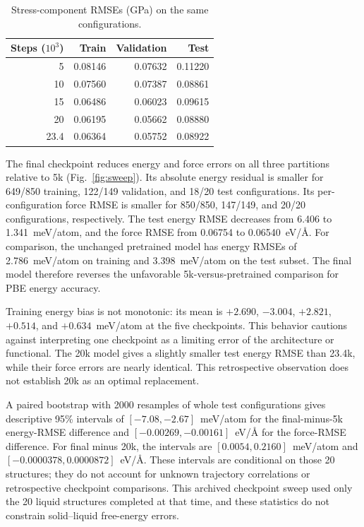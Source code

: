 \documentclass[10pt]{article}
\begin{document}
\begin{table}[htbp]
\centering
\caption{Stress-component RMSEs (GPa) on the same configurations.}
\label{tab:stress}
\begin{tabular}{r rrr}
\toprule
Steps ($10^3$) & Train & Validation & Test\\
\midrule
5 & 0.08146 & 0.07632 & 0.11220 \\
10 & 0.07560 & 0.07387 & 0.08861 \\
15 & 0.06486 & 0.06023 & 0.09615 \\
20 & 0.06195 & 0.05662 & 0.08880 \\
23.4 & 0.06364 & 0.05752 & 0.08922 \\
\bottomrule
\end{tabular}
\end{table}

The final checkpoint reduces energy and force errors on all three partitions relative to 5k (Fig.~\ref{fig:sweep}). Its absolute energy residual is smaller for 649/850 training, 122/149 validation, and 18/20 test configurations. Its per-configuration force RMSE is smaller for 850/850, 147/149, and 20/20 configurations, respectively. The test energy RMSE decreases from 6.406 to 1.341~meV/atom, and the force RMSE from 0.06754 to 0.06540~eV/\AA. For comparison, the unchanged pretrained model has energy RMSEs of 2.786~meV/atom on training and 3.398~meV/atom on the test subset. The final model therefore reverses the unfavorable 5k-versus-pretrained comparison for PBE energy accuracy.

Training energy bias is not monotonic: its mean is $+2.690$, $-3.004$, $+2.821$, $+0.514$, and $+0.634$~meV/atom at the five checkpoints. This behavior cautions against interpreting one checkpoint as a limiting error of the architecture or functional. The 20k model gives a slightly smaller test energy RMSE than 23.4k, while their force errors are nearly identical. This retrospective observation does not establish 20k as an optimal replacement.

A paired bootstrap with 2000 resamples of whole test configurations gives descriptive 95\% intervals of $[-7.08,-2.67]$~meV/atom for the final-minus-5k energy-RMSE difference and $[-0.00269,-0.00161]$~eV/\AA{} for the force-RMSE difference. For final minus 20k, the intervals are $[0.0054,0.2160]$~meV/atom and $[-0.0000378,0.0000872]$~eV/\AA. These intervals are conditional on those 20 structures; they do not account for unknown trajectory correlations or retrospective checkpoint comparisons. This archived checkpoint sweep used only the 20 liquid structures completed at that time, and these statistics do not constrain solid--liquid free-energy errors.
\end{document}

